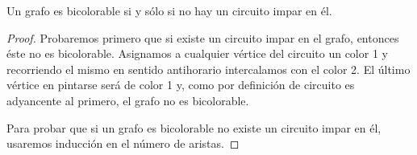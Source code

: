 \begin{teorema}
Un grafo es bicolorable si y sólo si no hay un circuito impar en él.
\end{teorema}

\begin{proof}
Probaremos primero que si existe un circuito impar en el grafo, entonces éste no es bicolorable.
Asignamos a cualquier vértice del circuito un color 1 y recorriendo el mismo en sentido antihorario intercalamos con el color 2. El último vértice en pintarse será de color 1 y, como por definición de circuito es adyancente al primero, el grafo no es bicolorable.

Para probar que si un grafo es bicolorable no existe un circuito impar en él, usaremos inducción en el número de aristas.
\end{proof}
